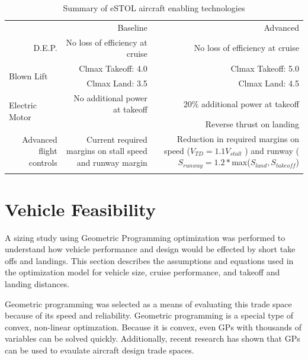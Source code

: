 \documentclass[]{aiaa-tc}%
\begin{document}
\begin{table}[htbp]
  \centering
  \caption{Summary of eSTOL aircraft enabling technologies}
    \begin{tabular}{rrr}
          &       &  \\
    \midrule
          & \multicolumn{1}{p{14.915em}}{Baseline} & \multicolumn{1}{p{14.5em}}{Advanced} \\
    \midrule
    \multicolumn{1}{p{8.415em}}{D.E.P. } & \multicolumn{1}{p{14.915em}}{No loss of efficiency at cruise} & \multicolumn{1}{p{14.5em}}{No loss of efficiency at cruise} \\
    \multicolumn{1}{l}{\multirow{2}[0]{*}{Blown Lift}} & \multicolumn{1}{p{14.915em}}{Clmax Takeoff: 4.0} & \multicolumn{1}{p{14.5em}}{Clmax Takeoff: 5.0} \\
          & \multicolumn{1}{p{14.915em}}{Clmax Land: 3.5} & \multicolumn{1}{p{14.5em}}{Clmax Land: 4.5} \\
    \multicolumn{1}{l}{\multirow{2}[0]{*}{Electric Motor}} & \multicolumn{1}{p{14.915em}}{No additional power at takeoff} & \multicolumn{1}{p{14.5em}}{20\% additional power at takeoff} \\
          &       & \multicolumn{1}{p{14.5em}}{Reverse thrust on landing} \\
    \multicolumn{1}{p{8.415em}}{Advanced flight controls} & \multicolumn{1}{p{14.915em}}{Current required margins on stall speed and runway margin} & \multicolumn{1}{p{14.5em}}{Reduction in required margins on speed ($V_{TD} = 1.1 V_{stall}$ ) and runway ($S_{runway} = 1.2*$max($S_{land}, S_{takeoff}$)} \\
    \midrule
          &       &  \\
    \end{tabular}%
  \label{t:tech}%
\end{table}%


\section{Vehicle Feasibility}

A sizing study using Geometric Programming optimization was performed to understand how vehicle performance and design would be effected by short take offs and landings. 
This section describes the assumptions and equations used in the optimization model for vehicle size, cruise performance, and takeoff and landing distances.

Geometric programming was selected as a means of evaluating this trade space because of its speed and reliability.  
Geometric programming is a special type of convex, non-linear optimzation.\cite{gp}
Because it is convex, even GPs with thousands of variables can be solved quickly.\cite{gp}
Additionally, recent research has shown that GPs can be used to evaulate aircraft design trade spaces.\cite{burton_solar_2017}\cite{gpkit}
\end{document}
